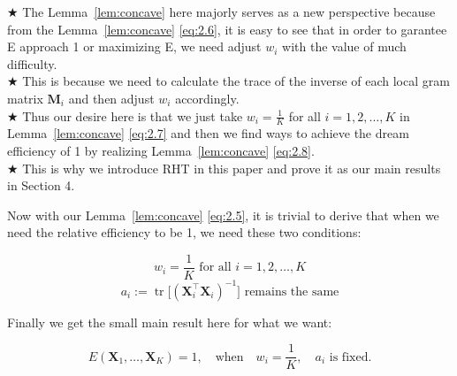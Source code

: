 \documentclass{beamer}
\theoremstyle{remark}
\begin{document}
\begin{frame}
  \noindent\(\bigstar\)\;
  The Lemma~\ref{lem:concave} here majorly serves as a new perspective because from the Lemma~\ref{lem:concave} \ref{eq:2.6}, it is easy to see that in order to garantee E approach 1 or maximizing E, we need adjust $w_i$ with the value of much difficulty.\\[4pt]
  \noindent\(\bigstar\)\;
  This is because we need to calculate the trace of the inverse of each local gram matrix $\mathbf{M}_i$ and then adjust $w_i$ accordingly.\\[4pt]
  \noindent\(\bigstar\)\;
  Thus our desire here is that we just take $w_i = \frac{1}{K}$ for all $i = 1,2,\ldots,K$ in Lemma~\ref{lem:concave} \ref{eq:2.7} and then we find ways to achieve the dream efficiency of 1 by realizing Lemma~\ref{lem:concave} \ref{eq:2.8}.\\[4pt]
  \noindent\(\bigstar\)\;
  This is why we introduce RHT in this paper and prove it as our main results in Section 4.\\[4pt]
\end{frame}
\begin{frame}
Now with our Lemma~\ref{lem:concave} \ref{eq:2.5}, it is trivial to derive that when we need the relative efficiency to be 1, we need these two conditions:

\[
w_i = \frac{1}{K} \text{ for all } i = 1,2,\ldots,K \tag{2.7} \label{eq:2.7}
\]
\[
a_i := \operatorname{tr}\!\bigl[(\mathbf{X}_i^{\top}\mathbf{X}_i)^{-1}\bigr] \text{ remains the same} \tag{2.8} \label{eq:2.8}
\]

Finally we get the small main result here for what we want:

\begin{equation}
E(\mathbf{X}_1,\ldots,\mathbf{X}_K) = 1, \quad \text{when} \quad w_i = \frac{1}{K}, \quad a_i \text{ is fixed}. \tag{2.9} \label{eq:2.9}
\end{equation}
\end{frame}
\end{document}
